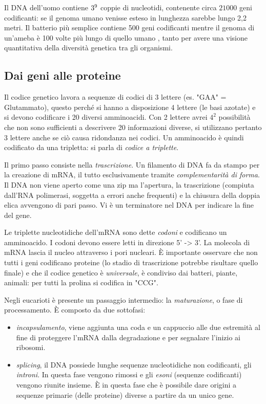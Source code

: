 Il DNA dell'uomo contiene $3\time10^{9}$ coppie di nucleotidi, contenente circa $21000$ geni codificanti: se il genoma umano venisse esteso in lunghezza sarebbe lungo 2,2 metri. Il batterio più semplice contiene 500 geni codificanti mentre il genoma di un'ameba è 100 volte più lungo di quello umano \supercite{alberts2018essential}, tanto per avere una visione quantitativa della diversità genetica tra gli organismi.


\subsection{Dai geni alle proteine}

Il codice genetico lavora a sequenze di codici di 3 lettere (es. "GAA" = Glutammato), questo perché si hanno a disposizione 4 lettere (le basi azotate) e si devono codificare i 20 diversi amminoacidi. Con 2 lettere avrei $4^{2}$ possibilità che non sono sufficienti a descrivere 20 informazioni diverse, si utilizzano pertanto 3 lettere anche se ciò causa ridondanza nei codici. Un amminoacido è quindi codificato da una tripletta: si parla di \textit{codice a triplette}. \\

\par Il primo passo consiste nella \textit{trascrizione}. Un filamento di DNA fa da stampo per la creazione di mRNA, il tutto esclusivamente tramite \textit{complementarità di forma}. Il DNA non viene aperto come una zip ma l'apertura, la trascrizione (compiuta dall'RNA polimerasi, soggetta a errori anche frequenti) e la chiusura della doppia elica avvengono di pari passo. Vi è un terminatore nel DNA per indicare la fine del gene. 

\par Le triplette nucleotidiche dell'mRNA sono dette \textit{codoni} e codificano un amminoacido. I codoni devono essere letti in direzione 5' -> 3'. La molecola di mRNA lascia il nucleo attraverso i pori nucleari. È importante osservare che non tutti i geni codificano proteine (lo stadio di trascrizione potrebbe risultare quello finale) e che il codice genetico è \textit{universale}, è condiviso dai batteri, piante, animali: per tutti la prolina si codifica in "CCG".

\par Negli eucarioti è presente un passaggio intermedio: la \textit{maturazione}, o fase di processamento. È composto da due sottofasi:
\begin{itemize}
	\item \textit{incapsulamento}, viene aggiunta una coda e un cappuccio alle due estremità al fine di proteggere l'mRNA dalla degradazione e per segnalare l'inizio ai ribosomi.
	\item \textit{splicing}, il DNA possiede lunghe sequenze nucleotidiche non codificanti, gli \textit{introni}. In questa fase vengono rimossi e gli \textit{esoni} (sequenze codificanti) vengono riunite insieme. È in questa fase che è possibile dare origini a sequenze primarie (delle proteine) diverse a partire da un unico gene.
\end{itemize}

